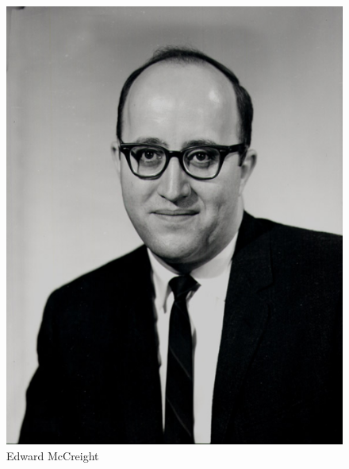 \documentclass{beamer}
\begin{document}
\begin{frame}
\begin{columns}
\begin{column}{0.3\textwidth}
\begin{block}{}
\begin{figure}
                    \includegraphics[height=0.35\textheight]{resources/made/McCreight.png}
                    \caption[]{Edward McCreight}
                \end{figure}
            \end{block}
        \end{column}
    \end{columns}
\end{frame}
\end{document}
